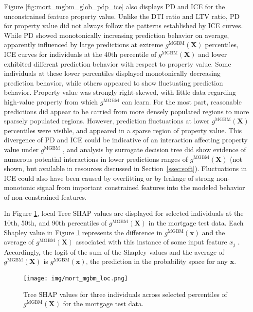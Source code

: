 \documentclass[information,article,accept,moreauthors,pdftex]{Definitions/mdpi}
\begin{document}
Figure \ref{fig:mort_mgbm_glob_pdp_ice} also displays PD and ICE for the unconstrained feature property value. Unlike the DTI ratio and LTV ratio, PD for property value did not always follow the patterns established by ICE curves. While PD showed monotonically increasing prediction behavior on average, apparently influenced by large predictions at extreme $g^{\text{MGBM}}(\mathbf{X})$ percentiles, ICE curves for individuals at the 40{th} percentile of $g^{\text{MGBM}}(\mathbf{X})$ and lower exhibited different prediction behavior with respect to property value. Some individuals at these lower percentiles displayed monotonically decreasing prediction behavior, while others appeared to show fluctuating prediction behavior. Property value was strongly right-skewed, with little data regarding high-value property from which $g^{\text{MGBM}}$ can learn. For the most part, reasonable predictions did appear to be carried from more densely populated regions to more sparsely populated regions. However, prediction fluctuations at lower $g^{\text{MGBM}}(\mathbf{X})$ percentiles were visible, and appeared in a sparse region of property value. This divergence of PD and ICE could be indicative of an interaction affecting property value under $g^{\text{MGBM}}$ \cite{ice_plots}, and analysis by surrogate decision tree did show evidence of numerous potential interactions in lower predictions ranges of $g^{\text{MGBM}}(\mathbf{X})$ \cite{art_and_sci} (not shown, but available in resources discussed in Section~\ref{ssec:soft}). Fluctuations in ICE could also have been caused by overfitting or by leakage of strong non-monotonic signal from important constrained features into the modeled behavior of non-constrained features.

In Figure \ref{fig:mort_mgbm_loc}, local Tree SHAP values are displayed for selected individuals at the 10{th}, 50{th}, and 90{th} percentiles of $g^{\text{MGBM}}(\mathbf{X})$ in the mortgage test data. Each Shapley value in Figure \ref{fig:mort_mgbm_loc} represents the difference in $g^\text{MGBM}(\mathbf{x})$ and the average of $g^\text{MGBM}(\mathbf{X})$ associated with this instance of some input feature $x_j$ \cite{molnar}. Accordingly, the logit of the sum of the Shapley values and the average of $g^\text{MGBM}(\mathbf{X})$ is $g^\text{MGBM}(\mathbf{x})$, the prediction in the probability space for any $\mathbf{x}$. 

\begin{figure}[H]
\centering
\texttt{[image: img/mort\_mgbm\_loc.png]}
\caption{Tree SHAP values for three individuals across selected percentiles of $g^\text{MGBM}(\mathbf{X})$ for the mortgage test data.}
\label{fig:mort_mgbm_loc}
\end{figure}   
\end{document}
